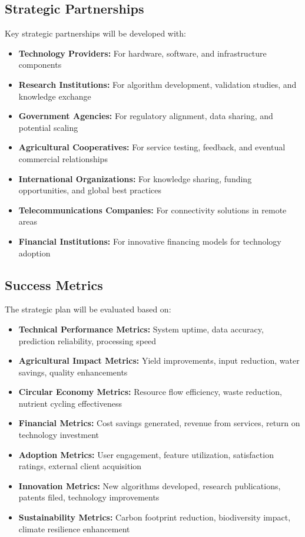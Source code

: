 \subsection{Strategic Partnerships}

Key strategic partnerships will be developed with:

\begin{itemize}
    \item \textbf{Technology Providers:} For hardware, software, and infrastructure components
    \item \textbf{Research Institutions:} For algorithm development, validation studies, and knowledge exchange
    \item \textbf{Government Agencies:} For regulatory alignment, data sharing, and potential scaling
    \item \textbf{Agricultural Cooperatives:} For service testing, feedback, and eventual commercial relationships
    \item \textbf{International Organizations:} For knowledge sharing, funding opportunities, and global best practices
    \item \textbf{Telecommunications Companies:} For connectivity solutions in remote areas
    \item \textbf{Financial Institutions:} For innovative financing models for technology adoption
\end{itemize}

\subsection{Success Metrics}

The strategic plan will be evaluated based on:

\begin{itemize}
    \item \textbf{Technical Performance Metrics:} System uptime, data accuracy, prediction reliability, processing speed
    \item \textbf{Agricultural Impact Metrics:} Yield improvements, input reduction, water savings, quality enhancements
    \item \textbf{Circular Economy Metrics:} Resource flow efficiency, waste reduction, nutrient cycling effectiveness
    \item \textbf{Financial Metrics:} Cost savings generated, revenue from services, return on technology investment
    \item \textbf{Adoption Metrics:} User engagement, feature utilization, satisfaction ratings, external client acquisition
    \item \textbf{Innovation Metrics:} New algorithms developed, research publications, patents filed, technology improvements
    \item \textbf{Sustainability Metrics:} Carbon footprint reduction, biodiversity impact, climate resilience enhancement
\end{itemize}

